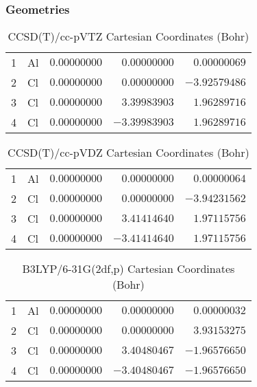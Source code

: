 \documentclass[10pt,oneside]{article}
\begin{document}
\clearpage

\subsection{\ \ \ }

\subsubsection*{Geometries}
\begin{table}[h!]
\centering
\caption{CCSD(T)/cc-pVTZ Cartesian Coordinates (Bohr)}
\begin{tabular}{llrrr}
1  & Al & $ 0.00000000$ & $ 0.00000000$ & $ 0.00000069$ \\
2  & Cl & $ 0.00000000$ & $ 0.00000000$ & $-3.92579486$ \\
3  & Cl & $ 0.00000000$ & $ 3.39983903$ & $ 1.96289716$ \\
4  & Cl & $ 0.00000000$ & $-3.39983903$ & $ 1.96289716$ \\
\end{tabular}
\end{table}

\begin{table}[h!]
\centering
\caption{CCSD(T)/cc-pVDZ Cartesian Coordinates (Bohr)}
\begin{tabular}{llrrr}
1  & Al & $ 0.00000000$ & $ 0.00000000$ & $ 0.00000064$ \\
2  & Cl & $ 0.00000000$ & $ 0.00000000$ & $-3.94231562$ \\
3  & Cl & $ 0.00000000$ & $ 3.41414640$ & $ 1.97115756$ \\
4  & Cl & $ 0.00000000$ & $-3.41414640$ & $ 1.97115756$ \\
\end{tabular}
\end{table}

\begin{table}[h!]
\centering
\caption{B3LYP/6-31G(2df,p) Cartesian Coordinates (Bohr)}
\begin{tabular}{llrrr}
1  & Al & $ 0.00000000$ & $ 0.00000000$ & $ 0.00000032$ \\
2  & Cl & $ 0.00000000$ & $ 0.00000000$ & $ 3.93153275$ \\
3  & Cl & $ 0.00000000$ & $ 3.40480467$ & $-1.96576650$ \\
4  & Cl & $ 0.00000000$ & $-3.40480467$ & $-1.96576650$ \\
\end{tabular}
\end{table}
\end{document}
